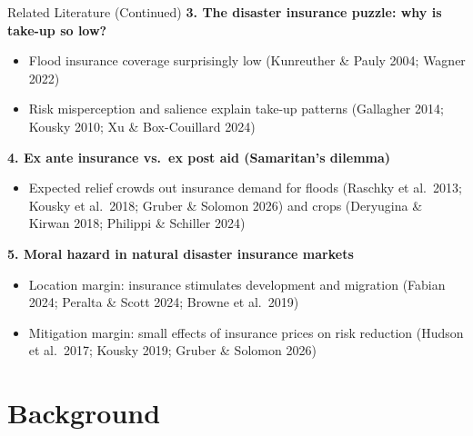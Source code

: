 \documentclass[serif, aspectratio=169, 10pt]{beamer}
\begin{document}
\begin{frame}{Related Literature (Continued)}
\small
\textbf{3. The disaster insurance puzzle: why is take-up so low?}
\begin{itemize}
    \item Flood insurance coverage surprisingly low (Kunreuther \& Pauly 2004; Wagner 2022)
    \item Risk misperception and salience explain take-up patterns (Gallagher 2014; Kousky 2010; Xu \& Box-Couillard 2024)
\end{itemize}
\textbf{4. Ex ante insurance vs.\ ex post aid (Samaritan's dilemma)}
\begin{itemize}
    \item Expected relief crowds out insurance demand for floods (Raschky et al.\ 2013; Kousky et al.\ 2018; Gruber \& Solomon 2026) and crops (Deryugina \& Kirwan 2018; Philippi \& Schiller 2024)
\end{itemize}
\textbf{5. Moral hazard in natural disaster insurance markets}
\begin{itemize}
    \item Location margin: insurance stimulates development and migration (Fabian 2024; Peralta \& Scott 2024; Browne et al.\ 2019)
    \item Mitigation margin: small effects of insurance prices on risk reduction (Hudson et al.\ 2017; Kousky 2019; Gruber \& Solomon 2026)
\end{itemize}
\end{frame}

\section{Background}
\end{document}
